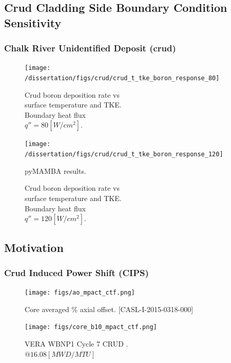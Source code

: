 \documentclass[t, pdftex]{beamer}
\begin{document}
\subsection*{Crud Cladding Side Boundary Condition Sensitivity}
\begin{frame}
\frametitle{Chalk River Unidentified Deposit (crud)}
\vspace{-12pt}
    \begin{figure}
    \centering
    \begin{minipage}{.5\textwidth}
        \centering
        \texttt{[image: /dissertation/figs/crud/crud\_t\_tke\_boron\_response\_80]}
        \caption{\centering Crud boron deposition rate vs \\ surface temperature and TKE. \\ Boundary heat flux \\ $q''=80[W/cm^2]$.  }
    \end{minipage}%
    \begin{minipage}{.5\textwidth}
        \centering
        \texttt{[image: /dissertation/figs/crud/crud\_t\_tke\_boron\_response\_120]}
        \caption{\centering Crud boron deposition rate vs \\ surface temperature and TKE.  \\ Boundary heat flux \\ $q''=120[W/cm^2]$. }
    \end{minipage}
pyMAMBA results. 
\end{figure}
\end{frame}

\subsection*{Motivation}
\begin{frame}
    \frametitle{Crud Induced Power Shift (CIPS)}
    \begin{figure}
        \centering
        \begin{minipage}{.5\textwidth}
            \centering
            \texttt{[image: figs/ao\_mpact\_ctf.png]}
            \caption{Core averaged \% axial offset.  [CASL-I-2015-0318-000]}
        \end{minipage}%
        \begin{minipage}{.5\textwidth}
            \centering
            \texttt{[image: figs/core\_b10\_mpact\_ctf.png]}
            \caption{VERA WBNP1 Cycle 7 CRUD . \\ $@ 16.08 [MWD/MTU]$}
        \end{minipage}
    \end{figure}
\end{frame}
\end{document}
